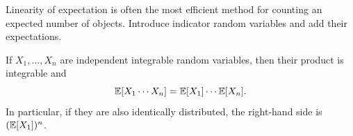     \begin{strategy}
        Linearity of expectation is often the most efficient method for counting
        an expected number of objects. Introduce indicator random variables and add their
        expectations.
    \end{strategy}

    \begin{proposition}
        If $X_1,\dots,X_n$ are independent integrable random variables, then
        their product is integrable and
        \[
            \mathbb{E}[X_1\cdots X_n]
            =
            \mathbb{E}[X_1]\cdots\mathbb{E}[X_n].
        \]
        In particular, if they are also identically distributed, the right-hand
        side is $(\mathbb{E}[X_1])^n$.
    \end{proposition}

